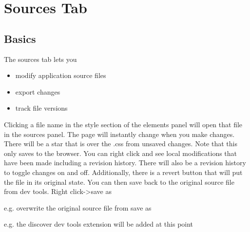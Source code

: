 \documentclass{article}
\begin{document}
	\section{Sources Tab}
	\subsection{Basics}
	The sources tab lets you
	\begin{itemize}
		\item modify application source files
		\item export changes
		\item track file versions
	\end{itemize}
Clicking a file name in the style section of the elements panel will open that file in the sources panel. The page will instantly change when you make changes. There will be a star that is over the .css from unsaved changes. Note that this only saves to the browser. You can right click and see local modifications that have been made including a revision history. There will also be a revision history to toggle changes on and off. Additionally, there is a revert button that will put the file in its original state. You can then save back to the original source file from dev tools. Right click->save as
	\begin{center}
e.g. overwrite the original source file from save as

e.g. the discover dev tools extension will be added at this point
	\end{center}
\end{document}
